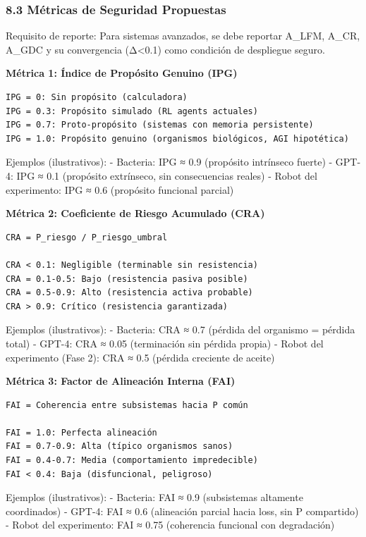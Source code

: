 \subsubsection{8.3 Métricas de Seguridad
Propuestas}\label{muxe9tricas-de-seguridad-propuestas}

Requisito de reporte: Para sistemas avanzados, se debe reportar A\_LFM,
A\_CR, A\_GDC y su convergencia (Δ\textless0.1) como condición de
despliegue seguro.

\textbf{Métrica 1: Índice de Propósito Genuino (IPG)}

\begin{verbatim}
IPG = 0: Sin propósito (calculadora)
IPG = 0.3: Propósito simulado (RL agents actuales)
IPG = 0.7: Proto-propósito (sistemas con memoria persistente)
IPG = 1.0: Propósito genuino (organismos biológicos, AGI hipotética)
\end{verbatim}

Ejemplos (ilustrativos): - Bacteria: IPG ≈ 0.9 (propósito intrínseco
fuerte) - GPT-4: IPG ≈ 0.1 (propósito extrínseco, sin consecuencias
reales) - Robot del experimento: IPG ≈ 0.6 (propósito funcional parcial)

\textbf{Métrica 2: Coeficiente de Riesgo Acumulado (CRA)}

\begin{verbatim}
CRA = P_riesgo / P_riesgo_umbral

CRA < 0.1: Negligible (terminable sin resistencia)
CRA = 0.1-0.5: Bajo (resistencia pasiva posible)
CRA = 0.5-0.9: Alto (resistencia activa probable)
CRA > 0.9: Crítico (resistencia garantizada)
\end{verbatim}

Ejemplos (ilustrativos): - Bacteria: CRA ≈ 0.7 (pérdida del organismo =
pérdida total) - GPT-4: CRA ≈ 0.05 (terminación sin pérdida propia) -
Robot del experimento (Fase 2): CRA ≈ 0.5 (pérdida creciente de aceite)

\textbf{Métrica 3: Factor de Alineación Interna (FAI)}

\begin{verbatim}
FAI = Coherencia entre subsistemas hacia P común

FAI = 1.0: Perfecta alineación
FAI = 0.7-0.9: Alta (típico organismos sanos)
FAI = 0.4-0.7: Media (comportamiento impredecible)
FAI < 0.4: Baja (disfuncional, peligroso)
\end{verbatim}

Ejemplos (ilustrativos): - Bacteria: FAI ≈ 0.9 (subsistemas altamente
coordinados) - GPT-4: FAI ≈ 0.6 (alineación parcial hacia loss, sin P
compartido) - Robot del experimento: FAI ≈ 0.75 (coherencia funcional
con degradación)

